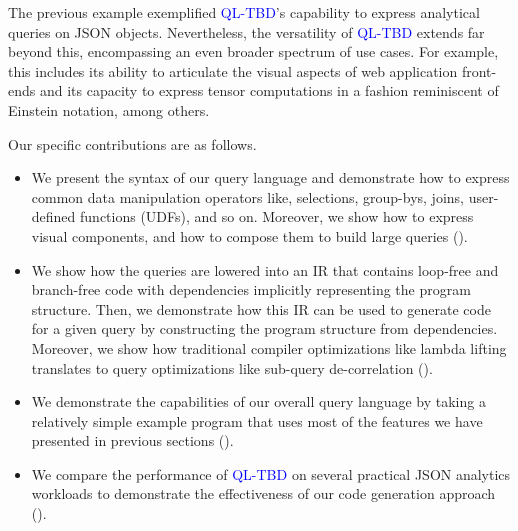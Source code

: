 \documentclass[runningheads]{llncs}
\newcommand{\lang}{\textcolor{blue}{QL-TBD}}
\begin{document}
The previous example exemplified \lang{}'s capability to express analytical queries on JSON
objects.
Nevertheless, the versatility of \lang{} extends far beyond this, encompassing an even broader
spectrum of use cases. 
For example, this includes its ability to articulate the visual aspects of web application
front-ends and its capacity to express tensor computations in a fashion reminiscent of
Einstein notation, among others.




Our specific contributions are as follows.

\begin{itemize}
    \item We present the syntax of our query language and demonstrate how to express common
          data manipulation operators like, selections, group-bys, joins, user-defined functions (UDFs),
          and so on.
          Moreover, we show how to express visual components, and how to compose them to build
          large queries ().
    \item We show how the queries are lowered into an IR that contains loop-free and branch-free code
          with dependencies implicitly representing the program structure.
          Then, we demonstrate how this IR can be used to generate code for a given query by constructing
          the program structure from dependencies.
          Moreover, we show how traditional compiler optimizations like lambda lifting translates to query
          optimizations like sub-query de-correlation ().
    \item We demonstrate the capabilities of our overall query language by taking a relatively simple example
          program that uses most of the features we have presented in previous sections ().
    \item We compare the performance of \lang{} on several practical JSON analytics workloads to demonstrate the
          effectiveness of our code generation approach ().
\end{itemize}
\end{document}

